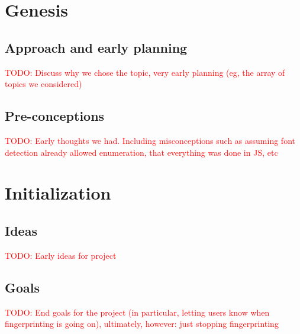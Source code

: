 \documentclass[12pt,a4paper]{article}
\begin{document}
\pagestyle{fancy}
\fancyhf{} %
\renewcommand{\headrulewidth}{0pt} %

\section{Genesis}
\subsection{Approach and early planning}
\textcolor{red}{TODO: Discuss why we chose the topic, very early planning (eg, the array of topics we considered)}

\subsection{Pre-conceptions}
\textcolor{red}{TODO: Early thoughts we had. Including misconceptions such as assuming font detection already allowed enumeration, that everything was done in JS, etc}

\section{Initialization}

\subsection{Ideas}
\textcolor{red}{TODO: Early ideas for project}

\subsection{Goals}
\textcolor{red}{TODO: End goals for the project (in particular, letting users know when fingerprinting is going on), ultimately, however: just stopping fingerprinting}
\end{document}

